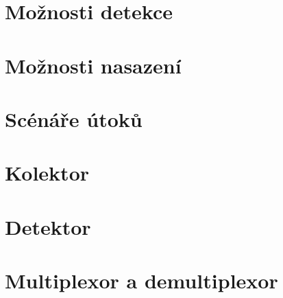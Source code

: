   \section{Možnosti detekce}
 \section{Možnosti nasazení}
 \section{Scénáře útoků}
 \section{Kolektor}
 \section{Detektor}
 \section{Multiplexor a demultiplexor}
